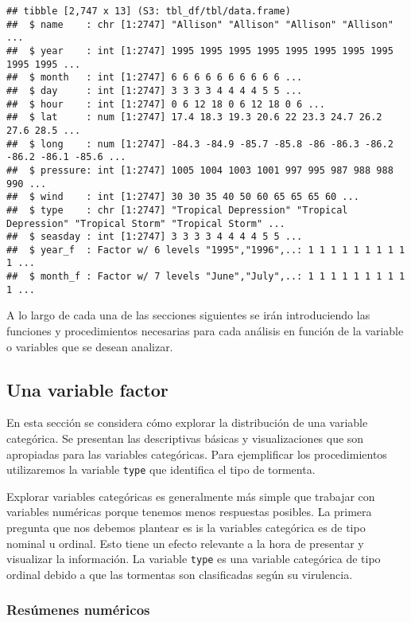\documentclass[
]{book}
\begin{document}
\begin{verbatim}
## tibble [2,747 x 13] (S3: tbl_df/tbl/data.frame)
##  $ name    : chr [1:2747] "Allison" "Allison" "Allison" "Allison" ...
##  $ year    : int [1:2747] 1995 1995 1995 1995 1995 1995 1995 1995 1995 1995 ...
##  $ month   : int [1:2747] 6 6 6 6 6 6 6 6 6 6 ...
##  $ day     : int [1:2747] 3 3 3 3 4 4 4 4 5 5 ...
##  $ hour    : int [1:2747] 0 6 12 18 0 6 12 18 0 6 ...
##  $ lat     : num [1:2747] 17.4 18.3 19.3 20.6 22 23.3 24.7 26.2 27.6 28.5 ...
##  $ long    : num [1:2747] -84.3 -84.9 -85.7 -85.8 -86 -86.3 -86.2 -86.2 -86.1 -85.6 ...
##  $ pressure: int [1:2747] 1005 1004 1003 1001 997 995 987 988 988 990 ...
##  $ wind    : int [1:2747] 30 30 35 40 50 60 65 65 65 60 ...
##  $ type    : chr [1:2747] "Tropical Depression" "Tropical Depression" "Tropical Storm" "Tropical Storm" ...
##  $ seasday : int [1:2747] 3 3 3 3 4 4 4 4 5 5 ...
##  $ year_f  : Factor w/ 6 levels "1995","1996",..: 1 1 1 1 1 1 1 1 1 1 ...
##  $ month_f : Factor w/ 7 levels "June","July",..: 1 1 1 1 1 1 1 1 1 1 ...
\end{verbatim}

A lo largo de cada una de las secciones siguientes se irán introduciendo las funciones y procedimientos necesarias para cada análisis en función de la variable o variables que se desean analizar.

\hypertarget{una-variable-factor}{%
\subsection{Una variable factor}\label{una-variable-factor}}

En esta sección se considera cómo explorar la distribución de una variable categórica. Se presentan las descriptivas básicas y visualizaciones que son apropiadas para las variables categóricas. Para ejemplificar los procedimientos utilizaremos la variable \texttt{type} que identifica el tipo de tormenta.

Explorar variables categóricas es generalmente más simple que trabajar con variables numéricas porque tenemos menos respuestas posibles. La primera pregunta que nos debemos plantear es is la variables categórica es de tipo nominal u ordinal. Esto tiene un efecto relevante a la hora de presentar y visualizar la información. La variable \texttt{type} es una variable categórica de tipo ordinal debido a que las tormentas son clasificadas según su virulencia.

\hypertarget{resuxfamenes-numuxe9ricos}{%
\subsubsection{Resúmenes numéricos}\label{resuxfamenes-numuxe9ricos}}
\end{document}
